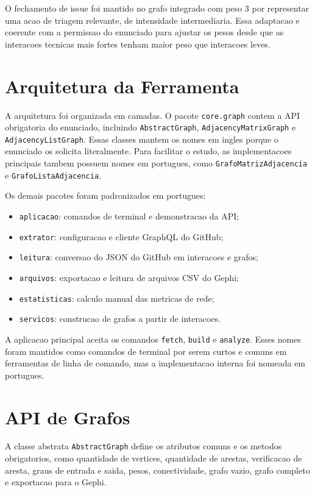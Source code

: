 \documentclass[12pt]{article}
\begin{document}
O fechamento de issue foi mantido no grafo integrado com peso 3 por representar
uma acao de triagem relevante, de intensidade intermediaria. Essa adaptacao e
coerente com a permissao do enunciado para ajustar os pesos desde que as
interacoes tecnicas mais fortes tenham maior peso que interacoes leves.

\section{Arquitetura da Ferramenta}

A arquitetura foi organizada em camadas. O pacote \texttt{core.graph} contem a
API obrigatoria do enunciado, incluindo \texttt{AbstractGraph},
\texttt{AdjacencyMatrixGraph} e \texttt{AdjacencyListGraph}. Essas classes
mantem os nomes em ingles porque o enunciado os solicita literalmente. Para
facilitar o estudo, as implementacoes principais tambem possuem nomes em
portugues, como \texttt{GrafoMatrizAdjacencia} e
\texttt{GrafoListaAdjacencia}.

Os demais pacotes foram padronizados em portugues:

\begin{itemize}
  \item \texttt{aplicacao}: comandos de terminal e demonstracao da API;
  \item \texttt{extrator}: configuracao e cliente GraphQL do GitHub;
  \item \texttt{leitura}: conversao do JSON do GitHub em interacoes e grafos;
  \item \texttt{arquivos}: exportacao e leitura de arquivos CSV do Gephi;
  \item \texttt{estatisticas}: calculo manual das metricas de rede;
  \item \texttt{servicos}: construcao de grafos a partir de interacoes.
\end{itemize}

A aplicacao principal aceita os comandos \texttt{fetch}, \texttt{build} e
\texttt{analyze}. Esses nomes foram mantidos como comandos de terminal por
serem curtos e comuns em ferramentas de linha de comando, mas a implementacao
interna foi nomeada em portugues.

\section{API de Grafos}

A classe abstrata \texttt{AbstractGraph} define os atributos comuns e os
metodos obrigatorios, como quantidade de vertices, quantidade de arestas,
verificacao de aresta, graus de entrada e saida, pesos, conectividade, grafo
vazio, grafo completo e exportacao para o Gephi.
\end{document}
